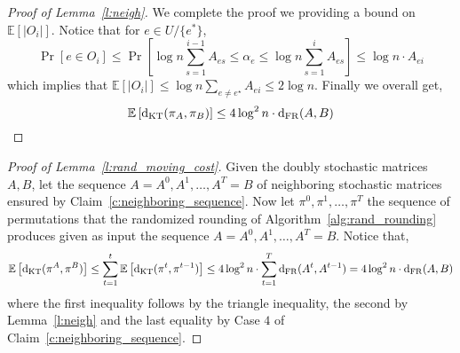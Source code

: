 \begin{proof}[Proof of Lemma~\ref{l:neigh}]
\noindent We complete the proof we providing a bound on $\mathbb{E}\left[|O_i|\right]$.  Notice that for $e \in U/ \{e^\ast\}$,
$$ \Pr[ e \in O_{i}] \leq \Pr \left [ \log n \sum_{s=1}^{i-1} A_{es} \leq \alpha_e \leq \log n \sum_{s=1}^{i} A_{es}\right] \leq \log n \cdot A_{ei} $$
which implies that $\mathbb{E}\left[|O_i|\right] \leq \log n \sum_{e \neq e^\star} A_{ei} \leq 2 \log n$. Finally we overall get,
$$\mathbb{E}\left[\mathrm{d}_{\mathrm{KT}}(\pi_A,\pi_B) \right] \leq
4\log^2 n \cdot \mathrm{d}_{\mathrm{FR}}(A,B)$$
\end{proof}



\begin{proof}[Proof of Lemma~\ref{l:rand_moving_cost}] Given the doubly stochastic matrices $A,B$, let the sequence  
$A = A^0,A^1,\ldots,A^T = B$ of neighboring stochastic matrices ensured by  Claim~\ref{c:neighboring_sequence}. Now let $\pi^0,\pi^1,\ldots,\pi^T$ the sequence of permutations that the randomized rounding of Algorithm~\ref{alg:rand_rounding} produces given as input the sequence $A = A^0,A^1,\ldots,A^T = B$. Notice that,
\[\mathbb{E}\left[\mathrm{d}_{\mathrm{KT}}(\pi^A,\pi^B)\right] \leq
\sum_{t=1}^t \mathbb{E}\left[\mathrm{d}_{\mathrm{KT}}(\pi^t,\pi^{t-1})\right]
\leq 4\log^2 n \cdot 
\sum_{t=1}^T\mathrm{d}_{\mathrm{FR}}(A^t,A^{t-1})
=  4\log^2 n \cdot \mathrm{d}_{\mathrm{FR}}(A,B)\]
where the first inequality follows by the triangle inequality, the second by Lemma~\ref{l:neigh}
and the last equality by Case $4$ of Claim~\ref{c:neighboring_sequence}.
\end{proof}
